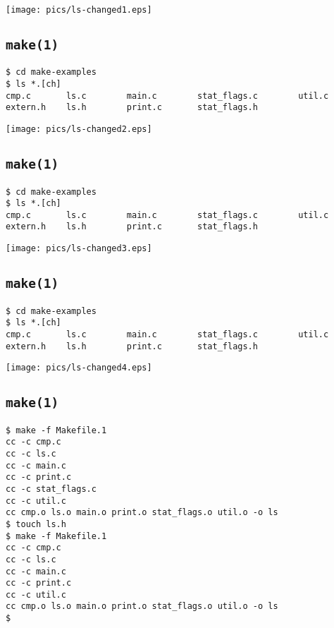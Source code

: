 \documentclass[xga]{xdvislides}
\begin{document}
\begin{center}
	\texttt{[image: pics/ls-changed1.eps]}
\end{center}

\subsection{{\tt make(1)}}

\begin{verbatim}
$ cd make-examples
$ ls *.[ch]
cmp.c       ls.c        main.c        stat_flags.c        util.c
extern.h    ls.h        print.c       stat_flags.h
\end{verbatim}

\begin{center}
	\texttt{[image: pics/ls-changed2.eps]}
\end{center}

\subsection{{\tt make(1)}}

\begin{verbatim}
$ cd make-examples
$ ls *.[ch]
cmp.c       ls.c        main.c        stat_flags.c        util.c
extern.h    ls.h        print.c       stat_flags.h
\end{verbatim}

\begin{center}
	\texttt{[image: pics/ls-changed3.eps]}
\end{center}

\subsection{{\tt make(1)}}

\begin{verbatim}
$ cd make-examples
$ ls *.[ch]
cmp.c       ls.c        main.c        stat_flags.c        util.c
extern.h    ls.h        print.c       stat_flags.h
\end{verbatim}

\begin{center}
	\texttt{[image: pics/ls-changed4.eps]}
\end{center}

\subsection{{\tt make(1)}}
\begin{verbatim}
$ make -f Makefile.1
cc -c cmp.c
cc -c ls.c
cc -c main.c
cc -c print.c
cc -c stat_flags.c
cc -c util.c
cc cmp.o ls.o main.o print.o stat_flags.o util.o -o ls
$ touch ls.h
$ make -f Makefile.1
cc -c cmp.c
cc -c ls.c
cc -c main.c
cc -c print.c
cc -c util.c
cc cmp.o ls.o main.o print.o stat_flags.o util.o -o ls
$
\end{verbatim}
\end{document}
